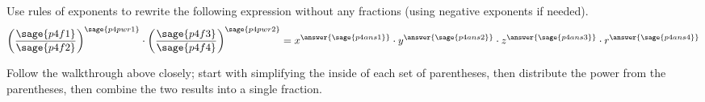 \documentclass{ximera}
\begin{document}
\begin{problem}
    Use rules of exponents to rewrite the following expression without any fractions (using negative exponents if needed).
    \[
        \left(\frac{\sage{p4f1}}{\sage{p4f2}}\right)^{\sage{p4pwr1}} \cdot \left(\frac{\sage{p4f3}}{\sage{p4f4}}\right)^{\sage{p4pwr2}} = x^{\answer{\sage{p4ans1}}}\cdot y^{\answer{\sage{p4ans2}}}\cdot z^{\answer{\sage{p4ans3}}} \cdot r^{\answer{\sage{p4ans4}}}
    \]
    \begin{feedback}
        Follow the walkthrough above closely; start with simplifying the inside of each set of parentheses, then distribute the power from the parentheses, then combine the two results into a single fraction. 
    \end{feedback}
\end{problem}
\end{document}

